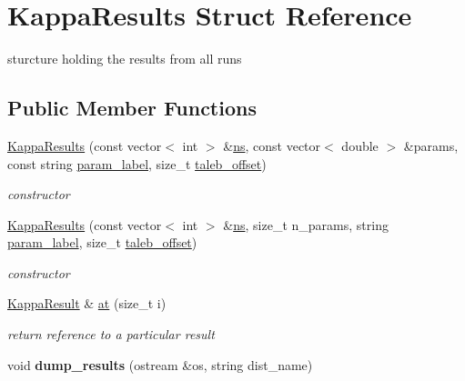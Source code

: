 \hypertarget{structKappaResults}{}\section{Kappa\+Results Struct Reference}
\label{structKappaResults}


sturcture holding the results from all runs  


\subsection*{Public Member Functions}
\begin{DoxyCompactItemize}
\item 
\mbox{\hyperlink{structKappaResults_a914068e2f53f303b501adf0e3b92a468}{Kappa\+Results}} (const vector$<$ int $>$ \&\mbox{\hyperlink{structKappaResults_a4e6a25c186ed54790616474d54a618c3}{ns}}, const vector$<$ double $>$ \&params, const string \mbox{\hyperlink{structKappaResults_a2b42189a3b7690aedacd6d77c05a1c5b}{param\+\_\+label}}, size\+\_\+t \mbox{\hyperlink{structKappaResults_a133dbed775f98f56566b9571ff05746d}{taleb\+\_\+offset}})
\begin{DoxyCompactList}\small\item\em constructor \end{DoxyCompactList}\item 
\mbox{\hyperlink{structKappaResults_afec7f4f7947b997b7bb15c308b66c7d4}{Kappa\+Results}} (const vector$<$ int $>$ \&\mbox{\hyperlink{structKappaResults_a4e6a25c186ed54790616474d54a618c3}{ns}}, size\+\_\+t n\+\_\+params, string \mbox{\hyperlink{structKappaResults_a2b42189a3b7690aedacd6d77c05a1c5b}{param\+\_\+label}}, size\+\_\+t \mbox{\hyperlink{structKappaResults_a133dbed775f98f56566b9571ff05746d}{taleb\+\_\+offset}})
\begin{DoxyCompactList}\small\item\em constructor \end{DoxyCompactList}\item 
\mbox{\label{structKappaResults_a8b791cd3e214acd7fb951d412f7385bc}} 
\mbox{\hyperlink{structKappaResult}{Kappa\+Result}} \& \mbox{\hyperlink{structKappaResults_a8b791cd3e214acd7fb951d412f7385bc}{at}} (size\+\_\+t i)
\begin{DoxyCompactList}\small\item\em return reference to a particular result \end{DoxyCompactList}\item 
\mbox{\label{structKappaResults_a9795d9a1c12f7af96684f6248a7a676f}} 
void {\bfseries dump\+\_\+results} (ostream \&os, string dist\+\_\+name)
\end{DoxyCompactItemize}
